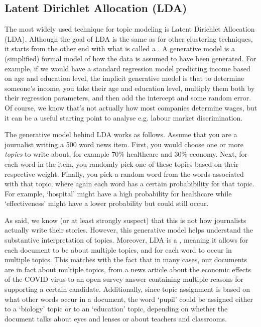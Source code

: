 \subsection{Latent Dirichlet Allocation (LDA)}

The most widely used technique for topic modeling is Latent Dirichlet Allocation (LDA).
Although the goal of LDA is the same as for other clustering techniques, it starts from the other end with what is called a .
A generative model is a (simplified) formal model of how the data is assumed to have been generated.
For example, if we would have a standard regression model predicting income based on age and education level,
the implicit generative model is that to determine someone's income, you take their age and education level,
multiply them both by their regression parameters, and then add the intercept and some random error.
Of course, we know that's not actually how most companies determine wages, but it can be a useful starting point to analyse e.g. labour market discrimination.

The generative model behind LDA works as follows.
Assume that you are a journalist writing a 500 word news item.
First, you would choose one or more \emph{topics} to write about,
for example 70\% healthcare and 30\% economy.
Next, for each word in the item, you randomly pick one of these topics based on their respective weight.
Finally, you pick a random word from the words associated with that topic,
where again each word has a certain probabibility for that topic.
For example, `hospital' might have a high probability for healthcare while `effectiveness' might have a lower probability but could still occur.

As said, we know (or at least strongly suspect) that this is not how journalists actually write their stories.
However, this generative model helps understand the substantive interpretation of topics.
Moreover, LDA is a , meaning it allows for each document to be about multiple topics, and for each word to occur in multiple topics.
This matches with the fact that in many cases, our documents are in fact about multiple topics,
from a news article about the economic effects of the COVID virus to an open survey answer containing multiple reasons for supporting a certain candidate. 
Additionally, since topic assignment is based on what other words occur in a document,
the word `pupil' could be assigned either to a `biology' topic or to an `education' topic, depending
on whether the document talks about eyes and lenses or about teachers and classrooms.

